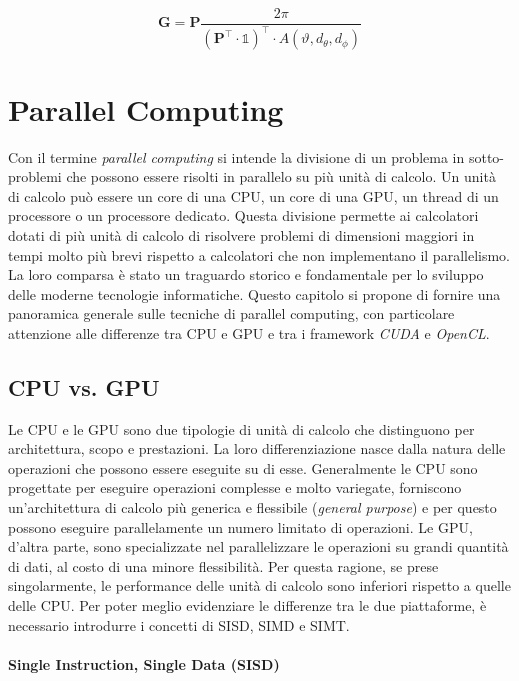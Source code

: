 \begin{equation}
  \label{eq:gain}\textbf{G}=\textbf{P}\frac{2\pi}{(\textbf{P}^{\top}\cdot
  \mathds{1})^{\top}\cdot A(\vartheta, d_{\theta}, d_{\phi})}
\end{equation}

\section{Parallel Computing}
\label{sec:parallelcomputing}

Con il termine \textit{parallel computing} si intende la divisione di un
problema in sotto-problemi che possono essere risolti in parallelo su più unità
di calcolo. Un unità di calcolo può essere un core di una CPU, un core di una
GPU, un thread di un processore o un processore dedicato. Questa divisione
permette ai calcolatori dotati di più unità di calcolo di risolvere problemi di
dimensioni maggiori in tempi molto più brevi rispetto a calcolatori che non
implementano il parallelismo. La loro comparsa è stato un traguardo storico e fondamentale
per lo sviluppo delle moderne tecnologie informatiche. Questo capitolo si
propone di fornire una panoramica generale sulle tecniche di parallel computing,
con particolare attenzione alle differenze tra CPU e GPU e tra i framework \textit{CUDA}
e \textit{OpenCL}.

\subsection{CPU vs. GPU}
\label{subsec:cpuvsgpu}

Le CPU e le GPU sono due tipologie di unità di calcolo che distinguono per
architettura, scopo e prestazioni. La loro differenziazione nasce dalla natura
delle operazioni che possono essere eseguite su di esse. Generalmente le CPU sono
progettate per eseguire operazioni complesse e molto variegate, forniscono un'architettura
di calcolo più generica e flessibile (\textit{general purpose}) e per questo possono
eseguire parallelamente un numero limitato di operazioni. Le GPU, d'altra parte,
sono specializzate nel parallelizzare le operazioni su grandi quantità di dati, al
costo di una minore flessibilità. Per questa ragione, se prese singolarmente, le
performance delle unità di calcolo sono inferiori rispetto a quelle delle CPU. Per
poter meglio evidenziare le differenze tra le due piattaforme, è necessario
introdurre i concetti di SISD, SIMD e SIMT.

\paragraph{Single Instruction, Single Data (SISD)}
\label{para:simd}

